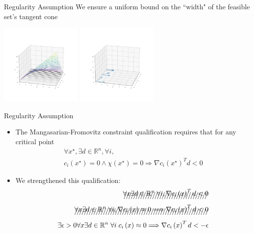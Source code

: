 \documentclass{beamer}
\newcommand{\Rn}{\mathbb R ^ {n}}
\begin{document}
\begin{frame}{Regularity Assumption}
	We ensure a uniform bound on the ``width" of the feasible set's tangent cone
	\begin{center}
		\includegraphics[width=150px]{images/decreasing_regularity.png}
		\includegraphics[width=150px]{images/decreasing_regularity_2.png}
	\end{center}
\end{frame}


\begin{frame}{Regularity Assumption}
\begin{itemize}
\item The Mangasarian-Fromovitz constraint qualification requires that for any critical point 
\begin{align*}
\forall x^{\star}, \exists d \in \Rn, \forall i, \\
c_i\left(x^{\star}\right)=0 \wedge \chi\left(x^{\star}\right) = 0 \Longrightarrow \nabla c_i\left(x^{\star}\right)^T d < 0 
\end{align*}
\item We strengthened this qualification:
\begin{align*}
\xout{\forall x \exists d \in \Rn\; \forall i, \nabla c_i\left(x\right)^T d < 0} \\
\xout{\forall x \exists d \in \Rn\; \forall i, \nabla c_i\left(x\right) \approx 0 \Longrightarrow \nabla c_i\left(x\right)^T d < 0} \\
\exists \epsilon>0 \forall x\exists d\in \Rn\; \forall i\; c_i\left(x\right) \approx 0
\Longrightarrow \nabla c_i\left(x\right)^T d < -\epsilon \\
\end{align*}
\end{itemize}
\end{frame}
\end{document}
